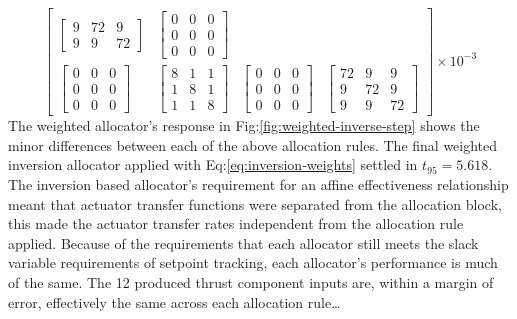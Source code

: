 \begin{equation}
\begin{bmatrix}
\begin{bmatrix}
9 & 72 & 9\\
9 & 9 & 72
\end{bmatrix}
&
\begin{bmatrix}
0 & 0 & 0\\
0 & 0 & 0\\
0 & 0 & 0
\end{bmatrix}
\\
\begin{bmatrix}
0 & 0 & 0\\
0 & 0 & 0\\
0 & 0 & 0
\end{bmatrix}
&
\begin{bmatrix}
8 & 1 & 1\\
1 & 8 & 1\\
1 & 1 & 8
\end{bmatrix}
&
\begin{bmatrix}
0 & 0 & 0\\
0 & 0 & 0\\
0 & 0 & 0
\end{bmatrix}
&
\begin{bmatrix}
72 & 9 & 9\\
9 & 72 & 9\\
9 & 9 & 72
\end{bmatrix}
\end{bmatrix}\times 10^{-3}
\end{equation}
The weighted allocator's response in Fig:\ref{fig:weighted-inverse-step} shows the minor differences between each of the above allocation rules. The final weighted inversion allocator applied with Eq:\ref{eq:inversion-weights} settled in $t_{95}=5.618$. The inversion based allocator's requirement for an affine effectiveness relationship meant that actuator transfer functions were separated from the allocation block, this made the actuator transfer rates independent from the allocation rule applied. Because of the requirements that each allocator still meets the slack variable requirements of setpoint tracking, each allocator's performance is much of the same. The 12 produced thrust component inputs are, within a margin of error, effectively the same across each allocation rule\ldots
\newpage
